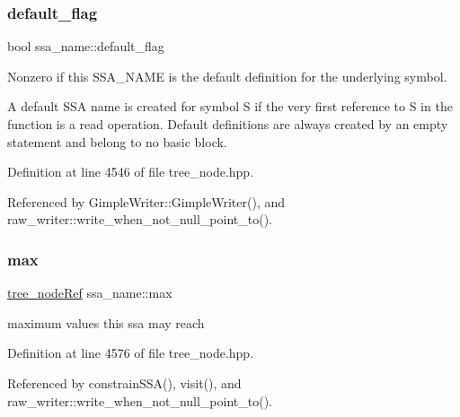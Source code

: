 \mbox{\label{structssa__name_a1ba658dc0923f60b209eead05891c584}} 
\subsubsection{\texorpdfstring{default\+\_\+flag}{default\_flag}}
{\footnotesize\ttfamily bool ssa\+\_\+name\+::default\+\_\+flag}



Nonzero if this S\+S\+A\+\_\+\+N\+A\+ME is the default definition for the underlying symbol. 

A default S\+SA name is created for symbol S if the very first reference to S in the function is a read operation. Default definitions are always created by an empty statement and belong to no basic block. 

Definition at line 4546 of file tree\+\_\+node.\+hpp.



Referenced by Gimple\+Writer\+::\+Gimple\+Writer(), and raw\+\_\+writer\+::write\+\_\+when\+\_\+not\+\_\+null\+\_\+point\+\_\+to().

\mbox{\label{structssa__name_ad67ae105cf2d0188ee9b12aebeb7ba67}} 
\subsubsection{\texorpdfstring{max}{max}}
{\footnotesize\ttfamily \hyperlink{tree__node_8hpp_a6ee377554d1c4871ad66a337eaa67fd5}{tree\+\_\+node\+Ref} ssa\+\_\+name\+::max}



maximum values this ssa may reach 



Definition at line 4576 of file tree\+\_\+node.\+hpp.



Referenced by constrain\+S\+S\+A(), visit(), and raw\+\_\+writer\+::write\+\_\+when\+\_\+not\+\_\+null\+\_\+point\+\_\+to().

\mbox{\label{structssa__name_a523462db8b8eef8217cd3ee8c395602c}} 
